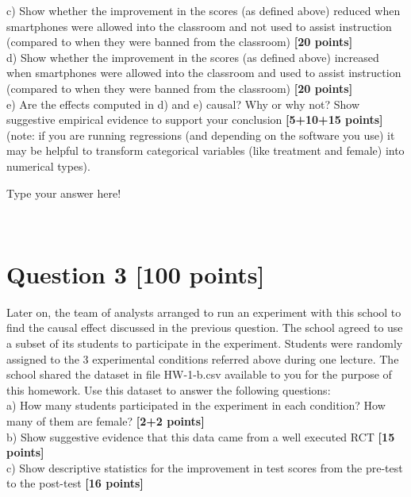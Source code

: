 \documentclass{article}
\begin{document}
c) Show whether the improvement in the scores (as defined above) reduced when smartphones were allowed into the classroom and not used to assist instruction (compared to when they were banned from the classroom) {\bf [20 points]}\\

d) Show whether the improvement in the scores (as defined above) increased when smartphones were allowed into the classroom and used to assist instruction (compared to when they were banned from the classroom) {\bf [20 points]}\\

e) Are the effects computed in d) and e) causal? Why or why not? Show suggestive empirical evidence to support your conclusion {\bf [5+10+15 points]}\\

(note: if you are running regressions (and depending on the software you use) it may be helpful to transform categorical variables (like treatment and female) into numerical types).

\vspace{1cm}

{\color{blue}

Type your answer here!
}\\

\section*{\color{black} Question 3 {\bf [100 points]}}

Later on, the team of analysts arranged to run an experiment with this school to find the causal effect discussed in the previous question. The school agreed to use a subset of its students to participate in the experiment. Students were randomly assigned to the 3 experimental conditions referred above during one lecture. The school shared the dataset in file HW-1-b.csv available to you for the purpose of this homework. Use this dataset to answer the following questions:\\

a) How many students participated in the experiment in each condition? How many of them are female? {\bf [2+2 points]}\\

b) Show suggestive evidence that this data came from a well executed RCT {\bf [15 points]}\\

c) Show descriptive statistics for the improvement in test scores from the pre-test to the post-test {\bf [16 points]}\\
\end{document}

